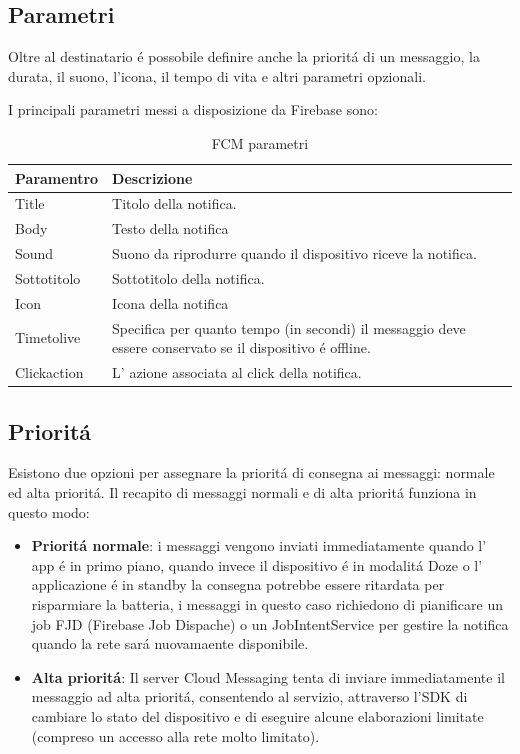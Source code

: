 \subsection{Parametri}

Oltre al destinatario \'e possobile definire anche la priorit\'a di un messaggio, la durata, il suono, l'icona, il tempo di vita e altri parametri opzionali.

I principali parametri messi a disposizione da Firebase sono:

\begin{table}[h]
\begin{center}
\begin{tabular}{|p{3cm}|p{11cm}|}
\hline
\textbf{Paramentro} & \textbf{Descrizione} \\ \hline
Title &	Titolo della notifica. \\   \hline
Body &	Testo della notifica \\   \hline
Sound  &	Suono da riprodurre quando il dispositivo riceve la notifica. \\   \hline
Sottotitolo  &	Sottotitolo della notifica. \\   \hline
Icon & Icona della notifica \\   \hline
Timetolive & Specifica per quanto tempo (in secondi) il messaggio deve essere conservato se il dispositivo \'e offline.  \\   \hline
Clickaction &	L' azione associata al click della notifica. \\   \hline

\end{tabular}
\caption[Cloud Messaging paramentri ]{FCM parametri}\label{tab:FCFM parametri}
\end{center}
\end{table}


\subsection{Priorit\'a}
Esistono due opzioni per assegnare la priorit\'a di consegna ai messaggi: normale ed alta priorit\'a. Il recapito di messaggi normali e di alta priorit\'a funziona in questo modo:
\begin{itemize}
\item  \textbf{Priorit\'a normale}: i messaggi vengono inviati immediatamente quando l' app \'e in primo piano, quando invece il dispositivo \'e in modalit\'a Doze o l' applicazione \'e in standby la consegna potrebbe essere ritardata per risparmiare la batteria, i messaggi in questo caso richiedono di pianificare un job FJD (Firebase Job Dispache) o un JobIntentService per gestire la notifica quando la rete sar\'a nuovamaente disponibile.
\item \textbf{Alta priorit\'a}: Il server Cloud Messaging tenta di inviare immediatamente il messaggio ad alta priorit\'a, consentendo al servizio, attraverso l'SDK di cambiare lo stato del dispositivo e di eseguire alcune elaborazioni limitate (compreso un accesso alla rete molto limitato).
\end{itemize}





